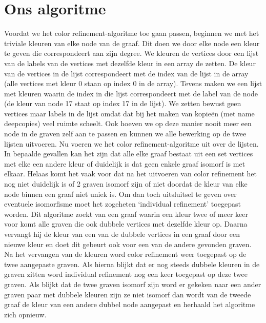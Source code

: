 \documentclass{article}
\begin{document}
\section{Ons algoritme}
Voordat we het color refinement-algoritme toe gaan passen, beginnen we met het triviale kleuren van elke node van de graaf. Dit doen we door elke node een kleur te geven die correspondeert aan zijn degree. We kleuren de vertices door een lijst van de labels van de vertices met dezelfde kleur in een array de zetten. De kleur van de vertices in de lijst correspondeert met de index van de lijst in de array (alle vertices met kleur 0 staan op index 0 in de array). Tevens maken we een lijst met kleuren waarin de index in die lijst correspondeert met de label van de node (de kleur van node 17 staat op index 17 in de lijst). We zetten bewust geen vertices maar labels in de lijst omdat dat bij het maken van kopie\"en (met name deepcopies) veel ruimte scheelt. Ook hoeven we op deze manier nooit meer een node in de graven zelf aan te passen en kunnen we alle bewerking op de twee lijsten uitvoeren. Nu voeren we het color refinement-algoritme uit over de lijsten. In bepaalde gevallen kan het zijn dat alle elke graaf bestaat uit een set vertices met elke een andere kleur of duidelijk is dat geen enkele graaf isomorf is met elkaar. Helaas komt het vaak voor dat na het uitvoeren van color refinement het nog niet duidelijk is of 2 graven isomorf zijn of niet doordat de kleur van elke node binnen een graaf niet uniek is. Om dan toch uitsluitsel te geven over eventuele isomorfisme moet het zogeheten `individual refinement' toegepast worden. Dit algoritme zoekt van een graaf waarin een kleur twee of meer keer voor komt alle graven die ook dubbele vertices met dezelfde kleur op. Daarna vervangt hij de kleur van een van de dubbele vertices in een graaf door een nieuwe kleur en doet dit gebeurt ook voor een van de andere gevonden graven. Na het vervangen van de kleuren word color refinement weer toegepast op de twee aangepaste graven. Als hierna blijkt dat er nog steeds dubbele kleuren in de graven zitten word individual refinement nog een keer toegepast op deze twee graven. Als blijkt dat de twee graven isomorf zijn word er gekeken naar een ander graven paar met dubbele kleuren zijn ze niet isomorf dan wordt van de tweede graaf de kleur van een andere dubbel node aangepast en herhaald het algoritme zich opnieuw.
\pagebreak

\end{document}
